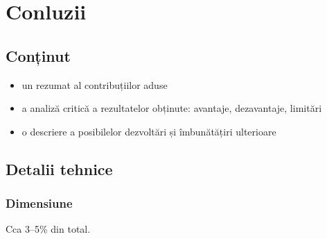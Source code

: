 \chapter{Conluzii}


\section{Conținut}

\begin{itemize}
 \item un rezumat al contribuțiilor aduse
 \item a analiză critică a rezultatelor obținute: avantaje, dezavantaje, limitări
 \item o descriere a posibilelor dezvoltări și îmbunătățiri ulterioare
\end{itemize}


\section{Detalii tehnice}

\subsection{Dimensiune}

Cca 3--5\% din total.




